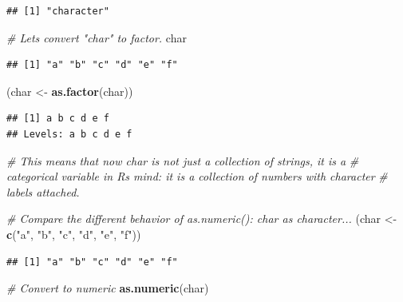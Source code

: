 \documentclass[
]{book}
\newenvironment{Shaded}{\begin{snugshade}}{\end{snugshade}}
\newcommand{\CommentTok}[1]{\textcolor[rgb]{0.56,0.35,0.01}{\textit{#1}}}
\newcommand{\FunctionTok}[1]{\textcolor[rgb]{0.13,0.29,0.53}{\textbf{#1}}}
\newcommand{\NormalTok}[1]{#1}
\newcommand{\OtherTok}[1]{\textcolor[rgb]{0.56,0.35,0.01}{#1}}
\newcommand{\StringTok}[1]{\textcolor[rgb]{0.31,0.60,0.02}{#1}}
\begin{document}
\begin{verbatim}
## [1] "character"
\end{verbatim}

\begin{Shaded}
\begin{Highlighting}[]
\CommentTok{\# Let\textquotesingle{}s convert "char" to factor.}
\NormalTok{char}
\end{Highlighting}
\end{Shaded}

\begin{verbatim}
## [1] "a" "b" "c" "d" "e" "f"
\end{verbatim}

\begin{Shaded}
\begin{Highlighting}[]
\NormalTok{(char }\OtherTok{\textless{}{-}} \FunctionTok{as.factor}\NormalTok{(char))}
\end{Highlighting}
\end{Shaded}

\begin{verbatim}
## [1] a b c d e f
## Levels: a b c d e f
\end{verbatim}

\begin{Shaded}
\begin{Highlighting}[]
\CommentTok{\# This means that now char is not just a collection of strings, it is a}
\CommentTok{\# categorical variable in R\textquotesingle{}s mind: it is a collection of numbers with character}
\CommentTok{\# labels attached.}

\CommentTok{\# Compare the different behavior of as.numeric(): char as character...}
\NormalTok{(char }\OtherTok{\textless{}{-}} \FunctionTok{c}\NormalTok{(}\StringTok{"a"}\NormalTok{, }\StringTok{"b"}\NormalTok{, }\StringTok{"c"}\NormalTok{, }\StringTok{"d"}\NormalTok{, }\StringTok{"e"}\NormalTok{, }\StringTok{"f"}\NormalTok{))}
\end{Highlighting}
\end{Shaded}

\begin{verbatim}
## [1] "a" "b" "c" "d" "e" "f"
\end{verbatim}

\begin{Shaded}
\begin{Highlighting}[]
\CommentTok{\# Convert to numeric}
\FunctionTok{as.numeric}\NormalTok{(char)}
\end{Highlighting}
\end{Shaded}
\end{document}
